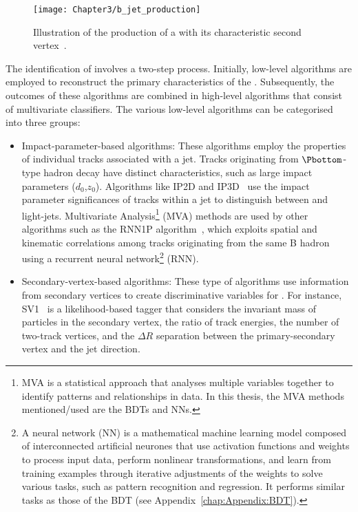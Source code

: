 \begin{figure}[h]
	\centering
 	 \texttt{[image: Chapter3/b\_jet\_production]}
	 \caption{Illustration of the production of a \bjet with its characteristic 
	 second vertex~\cite{ATLAS:2019bwq}.} %
	\label{fig:Chap3:b_jet_production}
\end{figure}

The identification of \bjets involves a two-step process. Initially, low-level algorithms 
are employed to reconstruct the primary characteristics of the \bjets. Subsequently, 
the outcomes of these algorithms are combined in high-level algorithms that consist 
of multivariate classifiers. The various low-level algorithms can be categorised into 
three groups:

\begin{itemize}
	\item Impact-parameter-based algorithms:
	These algorithms employ the properties of individual tracks associated with a jet. 
	Tracks originating from $\Pbottom$-type hadron decay have distinct characteristics, 
	such as large impact parameters ($d_0$,$z_0$). Algorithms like IP2D and 
	IP3D~\cite{ATLAS:2017bcq} use the impact parameter significances of tracks within a
	jet to distinguish between \bjets and light-jets. Multivariate Analysis\footnote{MVA is 
	a statistical approach that analyses multiple variables together to identify patterns and 
	relationships in data. In this thesis, the MVA methods mentioned/used are the BDTs and NNs.}
	(MVA) methods are used by 
	other algorithms such as the RNN1P algorithm~\cite{ATLAS:2017gpy}, which exploits 
	spatial and kinematic correlations among tracks originating from the same B hadron
	 using a recurrent neural network\footnote{A neural network (NN) is a mathematical 
	machine learning model composed of interconnected artificial neurones that use activation 
	functions and weights to process input data, perform nonlinear transformations, and learn 
	from training examples through iterative adjustments of the weights to solve various tasks, 
	such as pattern recognition and regression. It performs similar tasks as those of the BDT 
	(see Appendix~\ref{chap:Appendix:BDT}).} (RNN).
	
	\item Secondary-vertex-based algorithms: 
	These type of algorithms use information from secondary vertices to create 
	discriminative variables for \btag. For instance, SV1~\cite{ATLAS:2017kle} is 
	a likelihood-based tagger that considers the invariant mass of particles in the
	secondary vertex, the ratio of track energies, the number of two-track vertices,
	and the $\Delta R$ separation between the primary-secondary vertex 
	and the jet direction.
	

\end{itemize}
